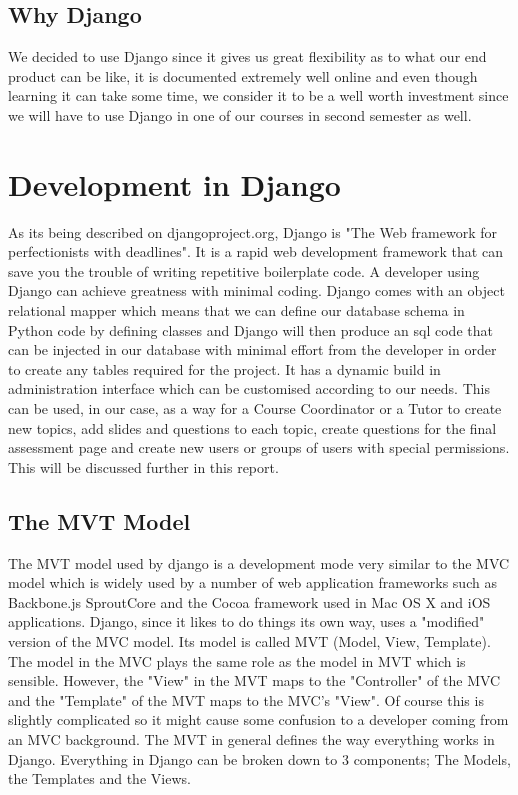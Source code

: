 \documentclass{l3proj}
\begin{document}
\subsection {Why Django}
We decided to use Django since it gives us great flexibility as to what our end product 
can be like, it is documented extremely well online and even though learning it can take 
some time, we consider it to be a well worth investment since we will have to use 
Django in one of our courses in second semester as well. 
\section{Development in Django}
As its being described on djangoproject.org, Django is "The Web framework for 
perfectionists with deadlines". It is a rapid web development framework that can save 
you the trouble of writing repetitive boilerplate code. A developer using Django can 
achieve greatness with minimal coding. Django comes with an object relational mapper 
which means that we can define our database schema in Python code by defining 
classes and Django will then produce an sql code that can be injected in our database 
with minimal effort from the developer in order to create any tables required for the 
project. It has a dynamic build in administration interface which can be customised 
according to our needs. This can be used, in our case, as a way for a Course 
Coordinator or a Tutor to create new topics, add slides and questions to each topic, 
create questions for the final assessment page and create new users or groups of users 
with special permissions. This will be discussed further in this report.
\subsection{The MVT Model}
The MVT model used by django is a development mode very similar to the MVC model which is widely used by a number of web application 
frameworks such as Backbone.js SproutCore and the Cocoa framework used in Mac OS X and iOS applications. Django, since it likes to do things its own way, uses a "modified" version of the MVC model. Its model is called MVT (Model, View, Template). The model in the MVC 
plays the same role as the model in MVT which is sensible. However, the "View" in the 
MVT maps to the "Controller" of the MVC and the "Template" of the MVT maps to the 
MVC's "View". Of course this is slightly complicated so it might cause some confusion to 
a developer coming from an MVC background. 
The MVT in general defines the way everything works in Django. Everything in Django 
can be broken down to 3 components; The Models, the Templates and the Views.
\end{document}
